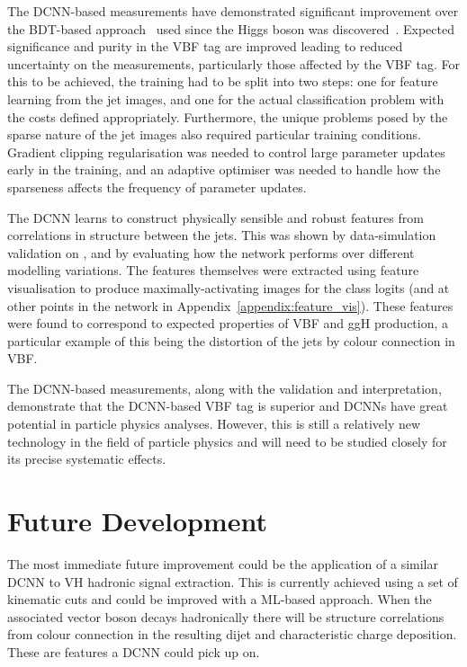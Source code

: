 The DCNN-based measurements have demonstrated significant improvement over the BDT-based approach~\cite{HIG-16-040} used since the Higgs boson was discovered~\cite{CMS_Higgs_disc}.
Expected significance and purity in the VBF tag are improved leading to reduced uncertainty on the measurements, particularly those affected by the VBF tag. 
For this to be achieved, the training had to be split into two steps: one for feature learning from the jet images, and one for the actual classification problem with the costs defined appropriately.
Furthermore, the unique problems posed by the sparse nature of the jet images also required particular training conditions. 
Gradient clipping regularisation was needed to control large parameter updates early in the training, and an adaptive optimiser was needed to handle how the sparseness affects the frequency of parameter updates.

The DCNN learns to construct physically sensible and robust features from correlations in structure between the jets.
This was shown by data-simulation validation on \Zee, and by evaluating how the network performs over different modelling variations. 
The features themselves were extracted using feature visualisation to produce maximally-activating images for the class logits (and at other points in the network in Appendix~\ref{appendix:feature_vis}). 
These features were found to correspond to expected properties of VBF and ggH production, a particular example of this being the distortion of the jets by colour connection in VBF.

The DCNN-based measurements, along with the validation and interpretation, demonstrate that the DCNN-based VBF tag is superior and DCNNs have great potential in particle physics analyses.
However, this is still a relatively new technology in the field of particle physics and will need to be studied closely for its precise systematic effects.




\section{Future Development}
The most immediate future improvement could be the application of a similar DCNN to VH hadronic signal extraction.
This is currently achieved using a set of kinematic cuts and could be improved with a ML-based approach.
When the associated vector boson decays hadronically there will be structure correlations from colour connection in the resulting dijet and characteristic charge deposition.
These are features a DCNN could pick up on.

